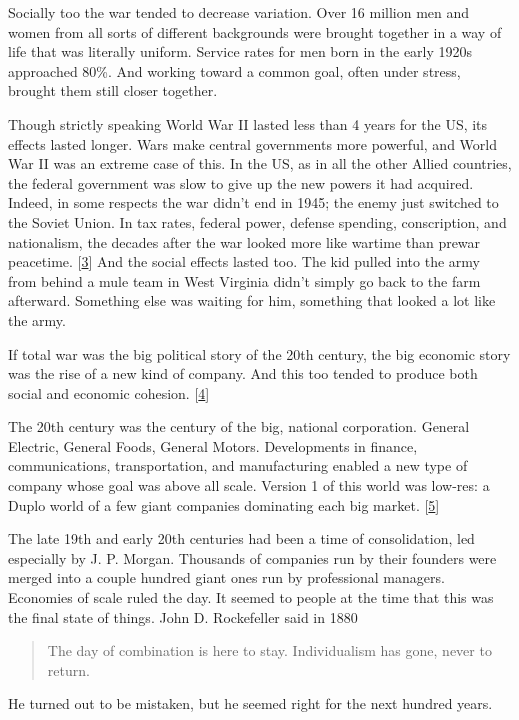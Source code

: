 Socially too the war tended to decrease variation.  Over 16 million
men and women from all sorts of different backgrounds were brought
together in a way of life that was literally uniform.  Service rates
for men born in the early 1920s approached 80\%. And working toward
a common goal, often under stress, brought them still closer together.

Though strictly speaking World War II lasted less than 4 years for
the US, its effects lasted longer.  Wars make central governments
more powerful, and World War II was an extreme case of this.  In
the US, as in all the other Allied countries, the federal government
was slow to give up the new powers it had acquired.  Indeed, in
some respects the war didn't end in 1945; the enemy just switched
to the Soviet Union.  In tax rates, federal power, defense spending,
conscription, and nationalism, the decades after the war looked more
like wartime than prewar peacetime.
[\href{\#f3n}{3}]
And the social effects
lasted too.  The kid pulled into the army from behind a mule team
in West Virginia didn't simply go back to the farm afterward.
Something else was waiting for him, something that looked a lot
like the army.

If total war was the big political story of the 20th century, the
big economic story was the rise of a new kind of company.  And this
too tended to produce both social and economic cohesion.
[\href{\#f4n}{4}]

The 20th century was the century of the big, national corporation.
General Electric, General Foods, General Motors.  Developments in
finance, communications, transportation, and manufacturing enabled
a new type of company whose goal was above all scale.  Version 1
of this world was low-res: a Duplo world of a few giant companies
dominating each big market.
[\href{\#f5n}{5}]

The late 19th and early 20th centuries had been a time of consolidation,
led especially by J. P. Morgan.  Thousands of companies run by their
founders were merged into a couple hundred giant ones run by
professional managers. Economies of scale ruled the day.  It seemed
to people at the time that this was the final state of things.  John
D. Rockefeller said in 1880
\begin{quote}

  The day of combination is here to stay. Individualism has gone,
  never to return.

\end{quote}

He turned out to be mistaken, but he seemed right for the next
hundred years.

